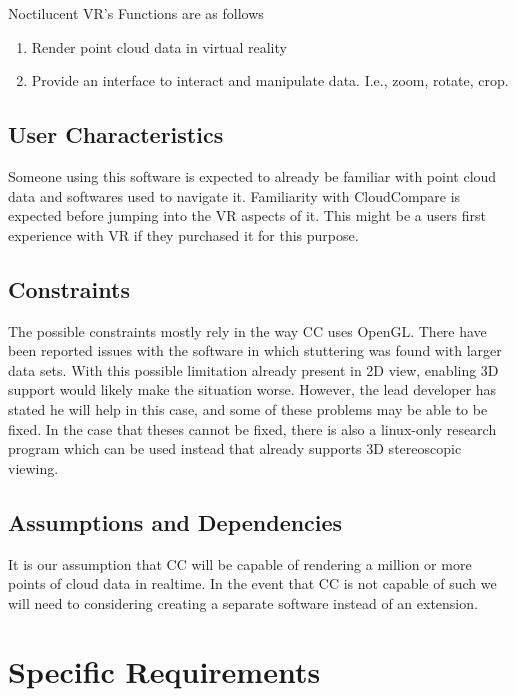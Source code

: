 \documentclass{article}
\begin{document}
Noctilucent VR's Functions are as follows

\begin{enumerate}
\item Render point cloud data in virtual reality
\item Provide an interface to interact and manipulate data. I.e., zoom, rotate, crop.
\end{enumerate}

\subsection{User Characteristics}

Someone using this software is expected to already be familiar with point cloud data and softwares used to navigate it. 
Familiarity with CloudCompare is expected before jumping into the VR aspects of it.
This might be a users first experience with VR if they purchased it for this purpose.

\subsection{Constraints}

The possible constraints mostly rely in the way CC uses OpenGL. There have been reported issues with the software in which
stuttering was found with larger data sets. With this possible limitation already present in 2D view, enabling 3D support would
likely make the situation worse. However, the lead developer has stated he will help in this case, and some of these problems 
may be able to be fixed. In the case that theses cannot be fixed, there is also a linux-only research program which can be used
instead that already supports 3D stereoscopic viewing.

\subsection{Assumptions and Dependencies}

It is our assumption that CC will be capable of rendering a million or more points of cloud data in realtime.
In the event that CC is not capable of such we will need to considering creating a separate software instead of an extension.

\section{Specific Requirements}
\end{document}
